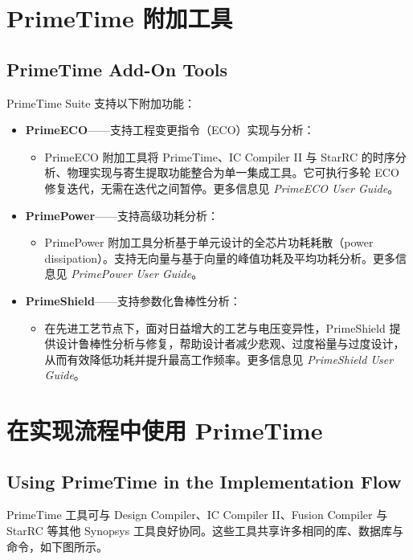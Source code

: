 \section{PrimeTime 附加工具}
\subsection*{PrimeTime Add-On Tools}

PrimeTime Suite 支持以下附加功能：
\begin{itemize}
  \item \textbf{PrimeECO}——支持工程变更指令（ECO）实现与分析：
  \begin{itemize}
    \item PrimeECO 附加工具将 PrimeTime、IC Compiler II 与 StarRC 的时序分析、物理实现与寄生提取功能整合为单一集成工具。它可执行多轮 ECO 修复迭代，无需在迭代之间暂停。更多信息见 \textit{PrimeECO User Guide}。
  \end{itemize}
  \item \textbf{PrimePower}——支持高级功耗分析：
  \begin{itemize}
    \item PrimePower 附加工具分析基于单元设计的全芯片功耗耗散（power dissipation）。支持无向量与基于向量的峰值功耗及平均功耗分析。更多信息见 \textit{PrimePower User Guide}。
  \end{itemize}
  \item \textbf{PrimeShield}——支持参数化鲁棒性分析：
  \begin{itemize}
    \item 在先进工艺节点下，面对日益增大的工艺与电压变异性，PrimeShield 提供设计鲁棒性分析与修复，帮助设计者减少悲观、过度裕量与过度设计，从而有效降低功耗并提升最高工作频率。更多信息见 \textit{PrimeShield User Guide}。
  \end{itemize}
\end{itemize}

\section{在实现流程中使用 PrimeTime}
\subsection*{Using PrimeTime in the Implementation Flow}

PrimeTime 工具可与 Design Compiler、IC Compiler II、Fusion Compiler 与 StarRC 等其他 Synopsys 工具良好协同。这些工具共享许多相同的库、数据库与命令，如下图所示。

